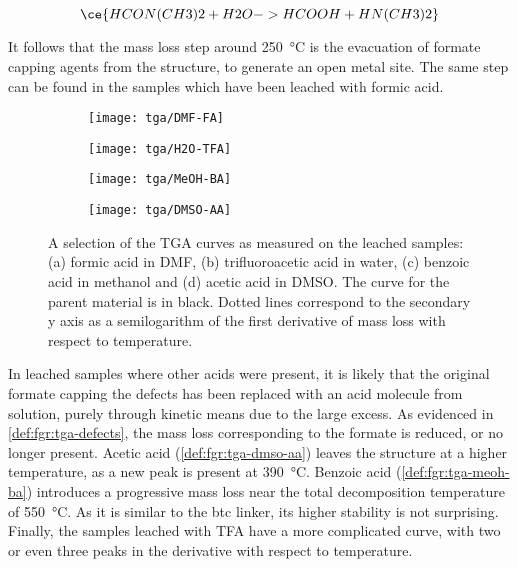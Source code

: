 \begin{equation}\label{def:eqn:dmf-hydrolysis}
    \ce{HCON(CH3)2 + H2O -> HCOOH + HN(CH3)2}
\end{equation}

It follows that the mass loss step around \SI{250}{\degreeCelsius}
is the evacuation of formate capping agents from the 
structure, to generate an open metal site. The same step
can be found in the samples which have been leached with
formic acid.

\begin{figure}[htbp]
    \centering

    \begin{subfigure}{0.45\linewidth}
        \texttt{[image: tga/DMF-FA]}%
		\caption{}%
        \label{def:fgr:tga-dmf-fa}
    \end{subfigure}
    \begin{subfigure}{0.45\linewidth}
        \texttt{[image: tga/H2O-TFA]}%
		\caption{}%
        \label{def:fgr:tga-h2o-tfa}
    \end{subfigure}

    
    \begin{subfigure}{0.45\linewidth}
        \texttt{[image: tga/MeOH-BA]}%
		\caption{}%
        \label{def:fgr:tga-meoh-ba}
    \end{subfigure}
    \begin{subfigure}{0.45\linewidth}
        \texttt{[image: tga/DMSO-AA]}%
		\caption{}%
        \label{def:fgr:tga-dmso-aa}
    \end{subfigure}

    \caption{A selection of the TGA curves as measured on the
    leached samples: (a) formic acid in DMF, (b) trifluoroacetic
    acid in water, (c) benzoic acid in methanol and (d) acetic acid
    in DMSO. The curve for the parent material is in black. 
    Dotted lines correspond to the secondary y axis as a 
    semilogarithm of the first derivative of mass loss with 
    respect to temperature.}%
    \label{def:fgr:tga-dataset}
\end{figure}

In leached samples where other acids were present,
it is likely that the original formate capping the defects 
has been replaced with an acid molecule from solution,
purely through kinetic means due to the large excess.
As evidenced in \autoref{def:fgr:tga-defects}, the mass 
loss corresponding to the formate is reduced, or no longer present. 
Acetic acid (\autoref{def:fgr:tga-dmso-aa}) leaves the 
structure at a higher temperature, as 
a new peak is present at \SI{390}{\degreeCelsius}.
Benzoic acid (\autoref{def:fgr:tga-meoh-ba}) introduces a progressive 
mass loss near the total decomposition temperature of \SI{550}{\degreeCelsius}.
As it is similar to the btc linker, its higher stability
is not surprising. Finally, the samples leached with 
TFA have a more complicated curve, with two or even 
three peaks in the derivative with respect to temperature.

